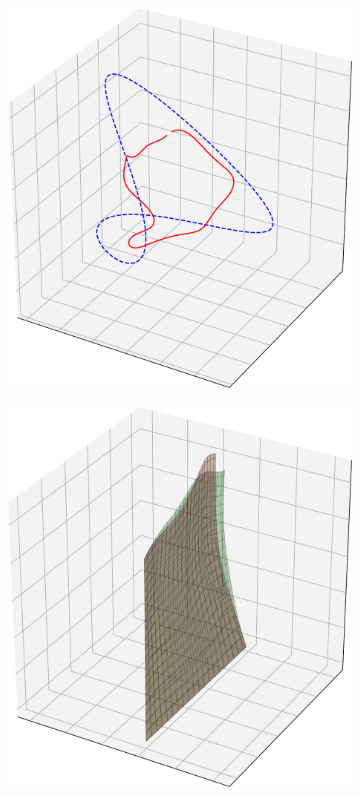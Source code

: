 \begin{figure} 
    \centering
    \begin{subfigure}[b]{0.47\textwidth}  
        \centering 
        \includegraphics[width=\textwidth]{figs_part2/benchmark_simulations/closure_failure_illustration}
        \caption[]%
        {}    
        \label{fig:rod closure failure illustration}
    \end{subfigure}
    \hfill
    \begin{subfigure}[b]{0.47\textwidth}
        \centering
        \includegraphics[width=\textwidth]{figs_part2/benchmark_simulations/surface_int_error_illustration}

\end{subfigure}
\end{figure}
